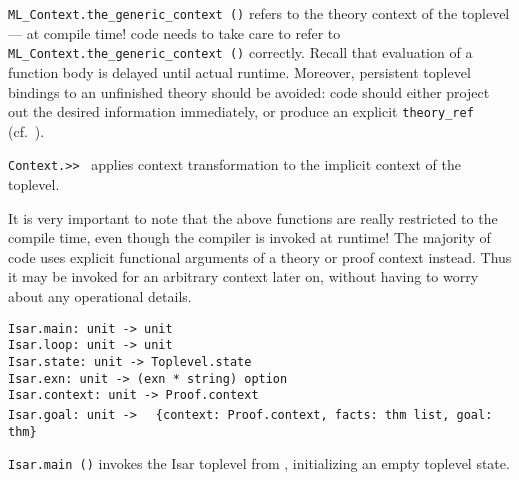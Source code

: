 \begin{isabellebody}
\begin{isamarkuptext}
  \begin{description}

  \item \verb|ML_Context.the_generic_context ()| refers to the theory
  context of the {\ML} toplevel --- at compile time!  {\ML} code needs
  to take care to refer to \verb|ML_Context.the_generic_context ()|
  correctly.  Recall that evaluation of a function body is delayed
  until actual runtime.  Moreover, persistent {\ML} toplevel bindings
  to an unfinished theory should be avoided: code should either
  project out the desired information immediately, or produce an
  explicit \verb|theory_ref| (cf.\ ).

  \item \verb|Context.>>|~ applies context transformation
   to the implicit context of the {\ML} toplevel.

  \end{description}

  It is very important to note that the above functions are really
  restricted to the compile time, even though the {\ML} compiler is
  invoked at runtime!  The majority of {\ML} code uses explicit
  functional arguments of a theory or proof context instead.  Thus it
  may be invoked for an arbitrary context later on, without having to
  worry about any operational details.

  \bigskip

  \begin{mldecls}
  \verb|Isar.main: unit -> unit| \\
  \verb|Isar.loop: unit -> unit| \\
  \verb|Isar.state: unit -> Toplevel.state| \\
  \verb|Isar.exn: unit -> (exn * string) option| \\
  \verb|Isar.context: unit -> Proof.context| \\
  \verb|Isar.goal: unit ->|\isasep\isanewline%
\verb|  {context: Proof.context, facts: thm list, goal: thm}| \\
  \end{mldecls}

  \begin{description}

  \item \verb|Isar.main ()| invokes the Isar toplevel from {\ML},
  initializing an empty toplevel state.


\end{description}
\end{isamarkuptext}
\end{isabellebody}
